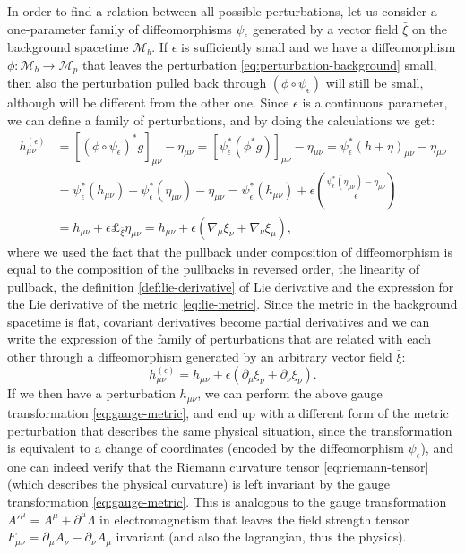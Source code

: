 \documentclass[a4paper]{article}
\begin{document}
In order to find a relation between all possible perturbations, let us consider a one-parameter family of diffeomorphisms $\psi_{\epsilon}$ generated by a vector field $\bar{\xi}$ on the background spacetime $\mathcal{M}_b$. If $\epsilon$ is sufficiently small and we have a diffeomorphism $\phi: \mathcal{M}_b \rightarrow \mathcal{M}_p$ that leaves the perturbation \eqref{eq:perturbation-background} small, then also the perturbation pulled back through $(\phi \circ \psi_{\epsilon})$ will still be small, although will be different from the other one. Since $\epsilon$ is a continuous parameter, we can define a family of perturbations, and by doing the calculations we get:
\begin{align}
  h_{\mu\nu}^{(\epsilon)} &= [(\phi \circ \psi_{\epsilon})^*g]_{\mu\nu} - \eta_{\mu\nu} = [\psi_{\epsilon}^*(\phi^*g)]_{\mu\nu} - \eta_{\mu\nu} = \psi_{\epsilon}^*(h+\eta)_{\mu\nu} - \eta_{\mu\nu}\nonumber \\
  &= \psi_{\epsilon}^*(h_{\mu\nu}) + \psi_{\epsilon}^*(\eta_{\mu\nu}) - \eta_{\mu\nu} = \psi_{\epsilon}^*(h_{\mu\nu}) + \epsilon \left(\frac{\psi^*_{\epsilon}(\eta_{\mu\nu})-\eta_{\mu\nu}}{\epsilon} \right) \nonumber \\
  &= h_{\mu\nu} + \epsilon \pounds_{\bar{\xi}}\eta_{\mu\nu} = h_{\mu\nu} + \epsilon(\nabla_{\mu}\xi_{\nu} + \nabla_{\nu}\xi_{\mu}),
\end{align}
where we used the fact that the pullback under composition of diffeomorphism is equal to the composition of the pullbacks in reversed order, the linearity of pullback, the definition \ref{def:lie-derivative} of Lie derivative and the expression for the Lie derivative of the metric \eqref{eq:lie-metric}. Since the metric in the background spacetime is flat, covariant derivatives become partial derivatives and we can write the expression of the family of perturbations that are related with each other through a diffeomorphism generated by an arbitrary vector field $\bar{\xi}$:
\begin{equation}
  h_{\mu\nu}^{(\epsilon)} = h_{\mu\nu} + \epsilon (\partial_{\mu} \xi_{\nu} + \partial_{\nu} \xi_{\nu}).
  \label{eq:gauge-metric}
\end{equation}
If we then have a perturbation $h_{\mu\nu}$, we can perform the above gauge transformation \eqref{eq:gauge-metric}, and end up with a different form of the metric perturbation that describes the same physical situation, since the transformation is equivalent to a change of coordinates (encoded by the diffeomorphism $\psi_{\epsilon}$), and 
one can indeed verify that the Riemann curvature tensor \eqref{eq:riemann-tensor} (which describes the physical curvature) is left invariant by the gauge transformation \eqref{eq:gauge-metric}. This is analogous to the gauge transformation $A'^{\mu} = A^{\mu} + \partial^{\mu}\Lambda$ in electromagnetism that leaves the field strength tensor $F_{\mu\nu} = \partial_{\mu}A_{\nu} - \partial_{\nu}A_{\mu}$ invariant (and also the lagrangian, thus the physics).
\end{document}

